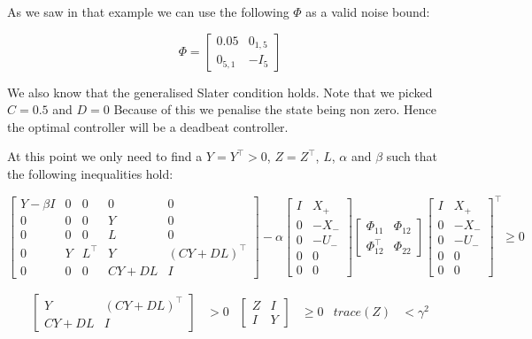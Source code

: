 As we saw in that example we can use the following $\Phi$ as a valid noise bound:

\begin{equation*}
\Phi = \begin{bmatrix} 0.05 & 0_{1,5} \\ 0_{5,1} & -I_5 \end{bmatrix}
\end{equation*}

We also know that the generalised Slater condition holds. Note that we picked $C = 0.5$ and $D=0$ Because of this we penalise the state being non zero. Hence the optimal controller will be a deadbeat controller. 

At this point we only need to find a $Y = Y^\top > 0$, $Z = Z^\top$, $L$, $\alpha$ and $\beta$ such that the following inequalities hold:

\begin{equation*}
	\begin{bmatrix}
		Y - \beta I & 0 & 0 & 0 & 0 \\
		0 & 0 & 0 & Y & 0 \\
		0 & 0 & 0 & L & 0 \\
		0 & Y & L^\top & Y & (CY + DL)^\top \\
		0 & 0 & 0 & CY + DL & I 
	\end{bmatrix} - \alpha
	\begin{bmatrix} I&X_+ \\ 0 & -X_- \\ 0&-U_- \\ 0&0 \\ 0&0 \end{bmatrix}
	\begin{bmatrix} \Phi_{11} & \Phi_{12} \\ \Phi_{12}^\top & \Phi_{22} \end{bmatrix}
	\begin{bmatrix} I&X_+ \\ 0 & -X_- \\ 0&-U_- \\ 0&0 \\ 0&0 \end{bmatrix}^\top \geq 0
\end{equation*}

\begin{align*}
	\begin{bmatrix} Y & (CY + DL)^\top \\ CY + DL & I \end{bmatrix} &> 0 &
	\begin{bmatrix} Z & I \\ I & Y \end{bmatrix} &\geq 0 &
	trace(Z) &< \gamma^2
\end{align*}

